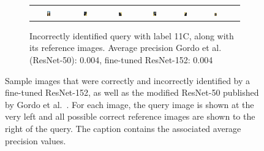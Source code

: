 \begin{figure}
\begin{subfigure}{\textwidth}
\begin{tabular}{|c|*{6}{c}}
\includegraphics[width=0.12\textwidth]{img/11C-0351.JPG} &
\includegraphics[width=0.12\textwidth]{img/11C-0.JPG} &
\includegraphics[width=0.12\textwidth]{img/11C-1.JPG} &
\includegraphics[width=0.12\textwidth]{img/11C-2.JPG} &
\includegraphics[width=0.12\textwidth]{img/11C-3.JPG} &
\includegraphics[width=0.12\textwidth]{img/11C-4.JPG} \\
\end{tabular}
\caption{Incorrectly identified query with label 11C,
along with its reference images.\newline
Average precision Gordo et al.~\cite{gordo_deep_2016} (ResNet-50): 0.004,
fine-tuned ResNet-152: 0.004
\label{fig:incorrect11C}}
\end{subfigure}
\caption{Sample images that were correctly and incorrectly identified
by a fine-tuned ResNet-152, as well as the modified ResNet-50 published by
Gordo et al.~\cite{gordo_deep_2016}. For each image,
the query image is shown at the very left and all possible correct reference
images are shown to the right of the query. The caption contains the
associated average precision values.
\label{fig:incorrectimg}}
\end{figure}

